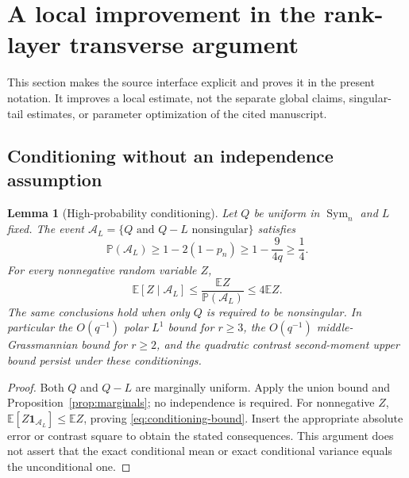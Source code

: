 \documentclass[11pt,a4paper]{article}
\newtheorem{lemma}[theorem]{Lemma}
\theoremstyle{definition}
\theoremstyle{remark}
\newcommand{\E}{\mathbb E}
\newcommand{\Pp}{\mathbb P}
\newcommand{\Sym}{\operatorname{Sym}}
\newcommand{\one}{\mathbf 1}
\begin{document}
\section{A local improvement in the rank-layer transverse argument}
\label{sec:application}
This section makes the source interface explicit and proves it in the
present notation. It improves a local estimate, not the separate global
claims, singular-tail estimates, or parameter optimization of the cited
manuscript.

\subsection{Conditioning without an independence assumption}
\begin{lemma}[High-probability conditioning]\label{lem:conditioning}
Let $Q$ be uniform in $\Sym_n$ and $L$ fixed. The event
$\mathcal A_L=\{Q\text{ and }Q-L\text{ nonsingular}\}$ satisfies
\begin{equation}\label{eq:conditioning-prob}
 \Pp(\mathcal A_L)\ge1-2(1-p_n)\ge1-\frac9{4q}\ge\frac14.
\end{equation}
For every nonnegative random variable $Z$,
\begin{equation}\label{eq:conditioning-bound}
 \E[Z\mid\mathcal A_L]\le\frac{\E Z}{\Pp(\mathcal A_L)}\le4\E Z.
\end{equation}
The same conclusions hold when only $Q$ is required to be nonsingular.
In particular the $O(q^{-1})$ polar $L^1$ bound for $r\ge3$, the
$O(q^{-1})$ middle-Grassmannian bound for $r\ge2$, and the quadratic
contrast second-moment upper bound persist under these conditionings.
\end{lemma}
\begin{proof}
Both $Q$ and $Q-L$ are marginally uniform. Apply the union bound and
Proposition~\ref{prop:marginals}; no independence is required.
For nonnegative $Z$, $\E[Z\one_{\mathcal A_L}]\le\E Z$, proving
\eqref{eq:conditioning-bound}. Insert the appropriate absolute error
or contrast square to obtain the stated consequences. This argument
does not assert that the exact conditional mean or exact conditional
variance equals the unconditional one.
\end{proof}
\end{document}
